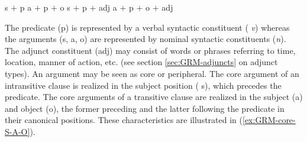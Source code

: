 \begin{exe}
\ex\label{ex:GRM-cl-fr-inst}
\begin{xlist}
\ex\label{ex:GRM-cl-fr-inst-s-p}
 {\sc s}  $+$ {\sc p} 
\ex\label{ex:GRM-cl-fr-inst-s-p-o}
 {\sc a}  $+$ {\sc p} $+$ {\sc o}
\ex\label{ex:GRM-cl-fr-inst-s-p-adj}
 {\sc s}  $+$ {\sc p}  $+$ {\sc adj} 
 \ex\label{ex:GRM-cl-fr-inst-s-p-o-adj}
 {\sc a}  $+$ {\sc p} $+$ {\sc o} $+$ {\sc adj} 

\end{xlist}
\end{exe}


The predicate ({\sc p})  is represented by a verbal syntactic constituent ({\it
v}) whereas  the arguments ({\sc s, a, o}) are represented by nominal syntactic
constituents   ({\it n}).  The adjunct constituent  ({\sc adj}) may consist of 
words or phrases referring to time, location, manner of action, etc.  (see
section \ref{sec:GRM-adjuncts} on adjunct types).  An
argument may be seen as core or peripheral.  The core
argument of an intransitive clause is realized in the subject position ({\sc
s}), which
precedes the predicate. The core arguments of a transitive clause are realized
in the subject ({\sc a}) and object ({\sc o}), the former preceding and the
latter following the predicate in their canonical positions. These
characteristics are illustrated in 
(\ref{ex:GRM-core-S-A-O}).









